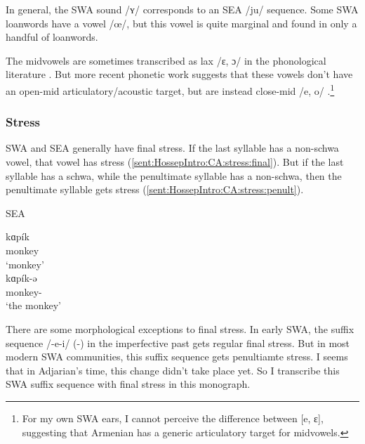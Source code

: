 In general, the SWA sound /ʏ/ corresponds to an SEA /ju/ sequence. Some SWA loanwords have a vowel /œ/, but this vowel is quite marginal and found in only a handful of loanwords. 

The midvowels are sometimes transcribed as lax /ɛ, ɔ/ in the phonological literature \citep{Vaux-1998-ArmenianPhono}. But more recent phonetic work suggests that these vowels don't have an open-mid articulatory/acoustic target, but are instead close-mid /e, o/ \citep{Toparlak-2019-MAArmenianPhonetics,Seyfarth-JIPAArmenian}.\footnote{For my own SWA ears, I cannot perceive the difference between [e, ɛ], suggesting that Armenian has a generic articulatory target for midvowels.}
	
\subsubsection{Stress}\label{sec:HossepIntro:phonotransc:modern:stress}




SWA and SEA generally have final stress. If the last syllable has a non-schwa vowel, that vowel has stress (\ref{sent:HossepIntro:CA:stress:final}). But if the last syllable has a schwa, while the penultimate syllable has a non-schwa, then the penultimate syllable gets stress (\ref{sent:HossepIntro:CA:stress:penult}). 

\begin{exe}
	\ex SEA \label{sent:HossepIntro:CA:stress}
	\begin{xlist}
		\ex \gll kɑp\'ik \\
		monkey \\
		\trans `monkey' \label{sent:HossepIntro:CA:stress:final}\\
		\ex \gll kɑp\'ik-ə \\
		monkey-{} \\
		\trans `the monkey' \label{sent:HossepIntro:CA:stress:penult} \\
		
	\end{xlist}
\end{exe}

There are some morphological exceptions to final stress. In early SWA, the suffix sequence /-e-i/ ({\thgloss}-{\pst}) in the imperfective past gets regular final stress. But in  most modern SWA communities, this suffix sequence gets penultiamte stress. I seems that in Adjarian's time, this change didn't take place yet. So I transcribe this SWA suffix sequence with final stress in this monograph. 

